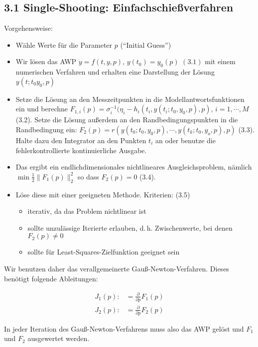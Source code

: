 
\subsection*{3.1 Single-Shooting: Einfachschießverfahren}


Vorgehensweise:
\begin{itemize}
\item Wähle Werte für die Parameter $p$ ("`Initial Guess"')
\item Wir lösen das AWP $\dot y = f(t,y,p)$, $y(t_0) = y_0(p)$ $(3.1)$ mit einem numerischen Verfahren und erhalten eine Darstellung der Lösung $y(t; t_0 y_0, p)$
\item Setze die Lösung an den Messzeitpunkten in die Modellantwortsfunktionen ein und berechne $F_{1,i}(p) = \sigma_i^{-1}(\eta_i - h_i(t_i, y(t_i; t_0, y_0, p), p)$, $i=1,\cdots,M$ (3.2). Setze die Lösung außerdem an den Randbedingungspunkten in die Randbedingung ein: $F_2(p) = r(y(t_0; t_0, y_0, p), \cdots, y(t_k; t_0, y_o, p), p)$ (3.3). Halte dazu den Integrator an den Punkten $t_i$ an oder benutze die fehlerkontrollierte kontinuierliche Ausgabe.
\item Das ergibt ein endlichdimensionales nichtlineares Ausgleichsproblem, nämlich $\min \tfrac 12 \|F_1(p)\|_2^2$ so dass $F_2(p) = 0$ (3.4).
\item Löse diese mit einer geeigneten Methode. Kriterien: (3.5)
\begin{itemize}
\item iterativ, da das Problem nichtlinear ist
\item sollte unzulässige Iterierte erlauben, d.\,h. Zwischenwerte, bei denen $F_2(p) \neq 0$
\item sollte für Least-Squares-Zielfunktion geeignet sein
\end{itemize}
\end{itemize}

Wir benutzen daher das verallgemeinerte Gauß-Newton-Verfahren. Dieses benötigt folgende Ableitungen:

\begin{align*}
J_1(p) \colon&= \frac \partial{\partial p} F_1(p) \\
J_2(p) \colon&= \frac \partial{\partial p} F_2(p)
\end{align*}

In jeder Iteration des Gauß-Newton-Verfahrens muss also das AWP gelöst und $F_1$ und $F_2$ ausgewertet werden.

